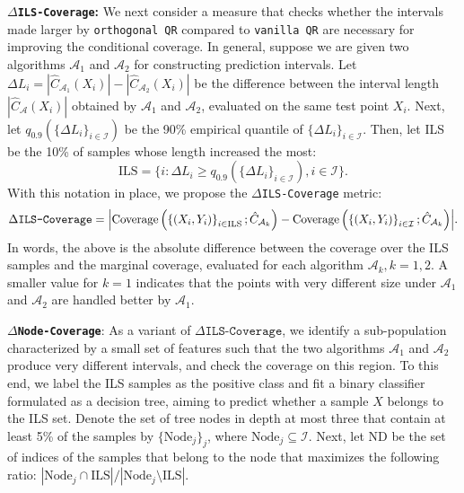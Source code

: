 \documentclass{article}
\begin{document}
\textbf{\texttt{$\Delta$ILS-Coverage}:} We next consider a measure that checks whether the intervals made larger by \texttt{orthogonal QR} compared to \texttt{vanilla QR} are necessary for improving the conditional coverage. In general, suppose we are given two algorithms $\mathcal{A}_1$ and $\mathcal{A}_2$ for constructing prediction intervals. Let
$\Delta L_i = |\hat{C}_{\mathcal{A}_1}(X_i)| - |\hat{C}_{\mathcal{A}_2}(X_i)|$
be the difference between the interval length $|\hat{C}_{\mathcal{A}}(X_i)|$ obtained by $\mathcal{A}_1$ and $\mathcal{A}_2$, evaluated on the same test point $X_i$. Next, let $q_{0.9}(\{\Delta L_i\}_{i\in\mathcal{I}})$ be the 90\% empirical quantile of $\{\Delta L_i\}_{i\in \mathcal{I}}$. Then, let ILS be the 10\% of samples whose length increased the most:
\begin{equation*}
\text{ILS} = \{i: \Delta L_i \geq q_{0.9}(\{\Delta L_i\}_{i \in \mathcal{I}}) , i \in \mathcal{I} \}.
\end{equation*}
With this notation in place, we propose the \texttt{$\Delta$ILS-Coverage} metric:
\begin{equation*}
\texttt{$\Delta$ILS-Coverage}=
\abs{\textrm{Coverage}\left(\left\{(X_i,Y_i)\right\}_{i \in \mathrm{ILS}}; \hat{C}_{\mathcal{A}_k}\right) - \textrm{Coverage}\left(\left\{(X_i,Y_i)\right\}_{i \in \mathcal{I}}; \hat{C}_{\mathcal{A}_k}\right)}.
\end{equation*}
In words, the above is the absolute difference between the coverage over the ILS samples and the marginal coverage, evaluated for each algorithm $\mathcal{A}_k, k=1,2$. A smaller value for $k=1$ indicates that the points with very different size under $\mathcal{A}_1$ and $\mathcal{A}_2$ are handled better by $\mathcal{A}_1$.


\texttt{\textbf{$\Delta$Node-Coverage}}: As a variant of $\texttt{$\Delta$ILS-Coverage}$, we identify a sub-population characterized by a small set of features such that the two algorithms $\mathcal{A}_1$ and $\mathcal{A}_2$ produce very different intervals, and check the coverage on this region.
To this end, we label the ILS samples as the positive class and fit a binary classifier formulated as a decision tree, aiming to predict whether a sample $X$ belongs to the ILS set. Denote the set of tree nodes in depth at most three that contain at least 5\% of the samples by $\{\textrm{Node}_j\}_j$, where $\textrm{Node}_j \subseteq  \mathcal{I}$. Next, let $\textrm{ND}$ be the set of indices of the samples that belong to the node that maximizes the following ratio: ${\left|{ \textrm{Node}_j \cap \text{ILS} } \right| / \left|\textrm{Node}_j \setminus \text{ILS} \right|}$.
\end{document}
